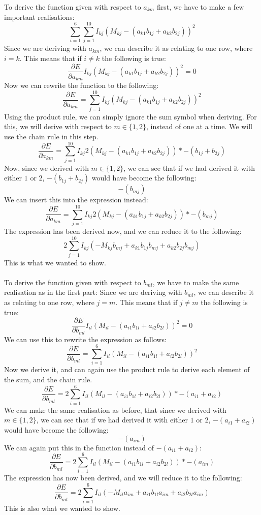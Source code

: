 To derive the function given with respect to $a_{km}$ first, we have to make a few important realisations:
$$\sum_{i=1}^6\sum_{j=1}^{10}I_{kj}(M_{kj}-(a_{k1}b_{1j}+a_{k2}b_{2j}))^2$$
Since we are deriving with $a_{km}$, we can describe it as relating to one row, where $i=k$. This means that if $i \neq k$ the following is true:
$$\frac{\partial E}{\partial a_{km}} I_{kj}(M_{kj}-(a_{k1}b_{1j}+a_{k2}b_{2j}))^2 = 0$$
Now we can rewrite the function to the following:
$$\frac{\partial E}{\partial a_{km}} = \sum_{j=1}^{10}I_{kj}(M_{kj}-(a_{k1}b_{1j}+a_{k2}b_{2j}))^2$$
Using the product rule, we can simply ignore the sum symbol when deriving. For this, we will derive with respect to $m \in \{1,2\}$, instead of one at a time. We will use the chain rule in this step.
$$\frac{\partial E}{\partial a_{km}} = \sum_{j=1}^{10}I_{kj}2(M_{kj}-(a_{k1}b_{1j}+a_{k2}b_{2j}))*-(b_{1j}+b_{2j})$$
Now, since we derived with $m \in \{1,2\}$, we can see that if we had derived it with either $1$ or $2$, $-(b_{1j}+b_{2j})$ would have become the following:
$$-(b_{mj})$$
We can insert this into the expression instead:
$$\frac{\partial E}{\partial a_{km}} = \sum_{j=1}^{10}I_{kj}2(M_{kj}-(a_{k1}b_{1j}+a_{k2}b_{2j}))*-(b_{mj})$$
The expression has been derived now, and we can reduce it to the following:
$$2\sum_{j=1}^{10}I_{kj}(-M_{kj}b_{mj}+a_{k1}b_{1j}b_{mj}+a_{k2}b_{2j}b_{mj})$$
This is what we wanted to show.\\
\\
To derive the function given with respect to $b_{ml}$, we have to make the same realisation as in the first part: Since we are deriving with $b_{ml}$, we can describe it as relating to one row, where $j=m$. This means that if $j \neq m$ the following is true:
$$\frac{\partial E}{\partial b_{ml}} I_{il}(M_{il}-(a_{i1}b_{1l}+a_{i2}b_{2l}))^2 = 0$$
We can use this to rewrite the expression as follows:
$$\frac{\partial E}{\partial b_{ml}} = \sum_{i=1}^{6}I_{il}(M_{il}-(a_{i1}b_{1l}+a_{i2}b_{2l}))^2$$
Now we derive it, and can again use the product rule to derive each element of the sum, and the chain rule.
$$\frac{\partial E}{\partial b_{ml}} = 2\sum_{i=1}^{6}I_{il}(M_{il}-(a_{i1}b_{1l}+a_{i2}b_{2l}))*-(a_{i1}+a_{i2})$$
We can make the same realisation as before, that since we derived with $m \in \{1,2\}$, we can see that if we had derived it with either $1$ or $2$, $-(a_{i1}+a_{i2})$ would have become the following:
$$-(a_{im})$$
We can again put this in the function instead of $-(a_{i1}+a_{i2})$:
$$\frac{\partial E}{\partial b_{ml}} = 2\sum_{i=1}^{6}I_{il}(M_{il}-(a_{i1}b_{1l}+a_{i2}b_{2l}))*-(a_{im})$$
The expression has now been derived, and we will reduce it to the following:
$$\frac{\partial E}{\partial b_{ml}} = 2\sum_{i=1}^6I_{il}(-M_{il}a_{im}+a_{i1}b_{1l}a_{im} + a_{i2}b_{2l}a_{im})$$
This is also what we wanted to show.